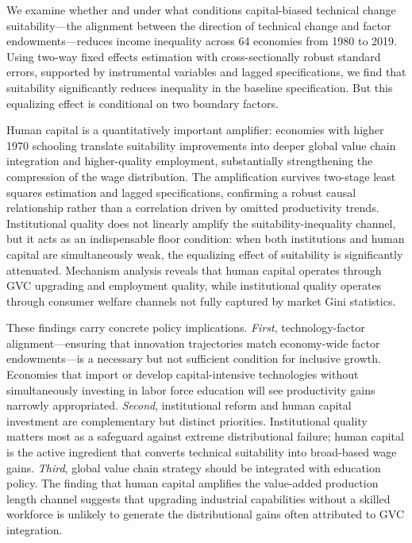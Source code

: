 \documentclass[12pt]{article}
\begin{document}
We examine whether and under what conditions capital-biased
technical change suitability---the alignment between the
direction of technical change and factor endowments---reduces
income inequality across 64 economies from 1980 to 2019.
Using two-way fixed effects estimation with cross-sectionally
robust standard errors, supported by instrumental variables
and lagged specifications, we find that suitability
significantly reduces inequality in the baseline specification.
But this equalizing effect is conditional on two boundary factors.

Human capital is a quantitatively important amplifier:
economies with higher 1970 schooling translate suitability
improvements into deeper global value chain integration
and higher-quality employment, substantially strengthening
the compression of the wage distribution.
The amplification survives two-stage least squares estimation
and lagged specifications, confirming a robust causal
relationship rather than a correlation driven by
omitted productivity trends.
Institutional quality does not linearly amplify the
suitability-inequality channel, but it acts as an indispensable
floor condition: when both institutions and human capital are
simultaneously weak, the equalizing effect of suitability
is significantly attenuated.
Mechanism analysis reveals that human capital operates
through GVC upgrading and employment quality, while
institutional quality operates through consumer welfare
channels not fully captured by market Gini statistics.

These findings carry concrete policy implications.
\emph{First}, technology-factor alignment---ensuring that
innovation trajectories match economy-wide factor
endowments---is a necessary but not sufficient condition
for inclusive growth.
Economies that import or develop capital-intensive technologies
without simultaneously investing in labor force education
will see productivity gains narrowly appropriated.
\emph{Second}, institutional reform and human capital investment
are complementary but distinct priorities.
Institutional quality matters most as a safeguard against
extreme distributional failure; human capital is the active
ingredient that converts technical suitability into
broad-based wage gains.
\emph{Third}, global value chain strategy should be integrated
with education policy.
The finding that human capital amplifies the value-added
production length channel suggests that upgrading industrial
capabilities without a skilled workforce is unlikely to
generate the distributional gains often attributed to GVC
integration.
\end{document}
